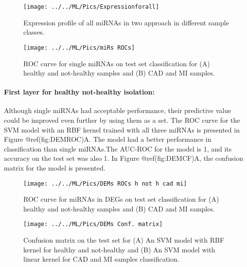 \documentclass[smallextended]{svjour3}       %
\begin{document}
\begin{figure}

{\centering \texttt{[image: ../../ML/Pics/Expressionforall]} 

}

\caption{Expression profile of all miRNAs in two approach in different sample classes.}\label{fig:Expall}
\end{figure}

\begin{figure}

{\centering \texttt{[image: ../../ML/Pics/miRs ROCs]} 

}

\caption{ROC curve for single miRNAs on test set classification for (A) healthy and not-healthy samples and (B) CAD and MI samples.}\label{fig:miRROC}
\end{figure}

\hypertarget{first-layer-for-healthy-not-healthy-isolation}{%
\paragraph{First layer for healthy not-healthy
isolation:}\label{first-layer-for-healthy-not-healthy-isolation}}

Although single miRNAs had acceptable performance, their predictive
value could be improved even further by using them as a set. The ROC
curve for the SVM model with an RBF kernel trained with all three miRNAs
is presented in Figure @ref(fig:DEMROC)A. The model had a better
performance in classification than single miRNAs.The AUC-ROC for the
model is 1, and its accuracy on the test set was also 1. In Figure
@ref(fig:DEMCF)A, the confusion matrix for the model is presented.

\begin{figure}

{\centering \texttt{[image: ../../ML/Pics/DEMs ROCs h not h cad mi]} 

}

\caption{ROC curve for miRNAs in DEGs on test set classification for (A) healthy and not-healthy samples and (B) CAD and MI samples.}\label{fig:DEMROC}
\end{figure}

\begin{figure}

{\centering \texttt{[image: ../../ML/Pics/DEMs Conf. matrix]} 

}

\caption{Confusion matrix on the test set for (A) An SVM model with RBF kernel for healthy and not-healthy and (B) An SVM model with linear kernel for CAD and MI samples classification.}\label{fig:DEMCF}
\end{figure}
\end{document}
